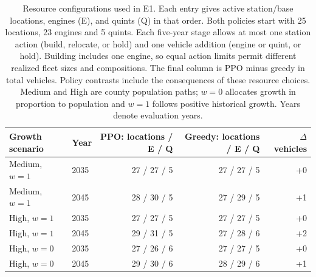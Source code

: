 \begin{table}[htbp]
\centering
\small
\caption{Resource configurations used in E1. Each entry gives active station/base locations, engines (E), and quints (Q) in that order. Both policies start with 25 locations, 23 engines and 5 quints. Each five-year stage allows at most one station action (build, relocate, or hold) and one vehicle addition (engine or quint, or hold). Building includes one engine, so equal action limits permit different realized fleet sizes and compositions. The final column is PPO minus greedy in total vehicles. Policy contrasts include the consequences of these resource choices. Medium and High are county population paths; $w=0$ allocates growth in proportion to population and $w=1$ follows positive historical growth. Years denote evaluation years.}
\label{tab:e1_resource_configurations}
\setlength{\tabcolsep}{4pt}
\begin{tabular}{llrrr}
\toprule
Growth scenario & Year & PPO: locations / E / Q & Greedy: locations / E / Q & $\Delta$ vehicles \\
\midrule
Medium, $w=1$ & 2035 & 27 / 27 / 5 & 27 / 27 / 5 & +0 \\
Medium, $w=1$ & 2045 & 28 / 30 / 5 & 27 / 29 / 5 & +1 \\
High, $w=1$ & 2035 & 27 / 27 / 5 & 27 / 27 / 5 & +0 \\
High, $w=1$ & 2045 & 29 / 31 / 5 & 27 / 28 / 6 & +2 \\
High, $w=0$ & 2035 & 27 / 26 / 6 & 27 / 27 / 5 & +0 \\
High, $w=0$ & 2045 & 29 / 30 / 6 & 28 / 29 / 6 & +1 \\
\bottomrule
\end{tabular}
\end{table}
